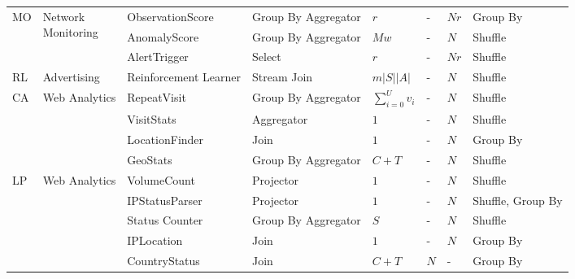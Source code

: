 \documentclass[ppgc,diss,english]{iiufrgs}
\begin{document}
\begin{table}[h]
\begin{center}
\begin{tabular}{ | l | p{2.5cm} | p{2.5cm} | p{2cm} | l | l | l | p{1.5cm} | }
    		\multirow{2}{*}{MO} & \multirow{2}{*}{\parbox[t]{2.5cm}{Network\\Monitoring}} & ObservationScore & Group By Aggregator & $r$  & - & $Nr$ & Group By \\\cline{3-8}
    					        &                                                         & AnomalyScore     & Group By Aggregator & $Mw$ & - & $N$ & Shuffle \\\cline{3-8}
    					        &                                                         & AlertTrigger     & Select              & $r$  & - & $Nr$ & Shuffle \\\hline
    					        
    		\multirow{1}{*}{RL} & \multirow{1}{*}{Advertising} & Reinforcement Learner & Stream Join & $m|S||A|$ & - & $N$ & Shuffle \\\hline
    		
    		\multirow{2}{*}{CA} & \multirow{2}{*}{\parbox[t]{2.5cm}{Web Analytics}} & RepeatVisit    & Group By Aggregator & $\sum_{i=0}^{U}v_{i}$  & - & $N$ & Shuffle \\\cline{3-8}
    					        &                                                   & VisitStats     & Aggregator          & $1$                    & - & $N$ & Shuffle \\\cline{3-8}
    					        &                                                   & LocationFinder & Join                & $1$                    & - & $N$ & Group By \\\cline{3-8}
    					        &                                                   & GeoStats       & Group By Aggregator & $C + T$                & - & $N$ & Shuffle \\\hline
    					        
    		\multirow{2}{*}{LP} & \multirow{2}{*}{\parbox[t]{2.5cm}{Web Analytics}} & VolumeCount    & Projector 	       & $1$  & - & $N$ & Shuffle \\\cline{3-8}
    					        &                                                   & IPStatusParser & Projector           & $1$  & - & $N$ & Shuffle, Group By \\\cline{3-8}
    					        &                                                   & Status Counter & Group By Aggregator & $S$  & - & $N$ & Shuffle \\\cline{3-8}
    					        &                                                   & IPLocation     & Join                & $1$  & - & $N$ & Group By \\\cline{3-8}
    					        &                                                   & CountryStatus  & Join                & $C + T$  & $N$ & - & Group By \\\hline
    					        

\end{tabular}
\end{center}
\end{table}
\end{document}
